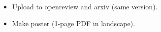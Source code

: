 \begin{itemize}
    \item Upload to openreview and arxiv (same version).
    \item Make poster (1-page PDF in landscape).
\end{itemize}
\clearpage
